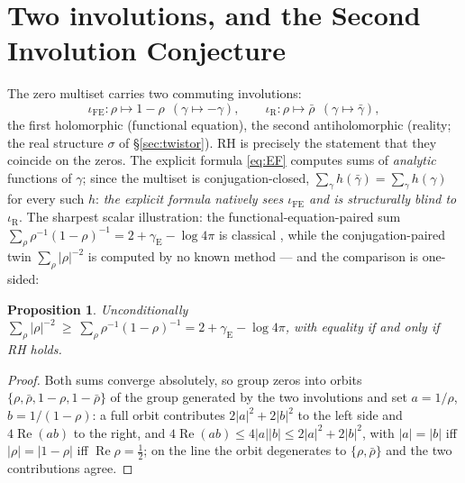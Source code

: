 \documentclass[11pt]{amsart}
\theoremstyle{plain}
\newtheorem{proposition}[theorem]{Proposition}
\theoremstyle{definition}
\theoremstyle{remark}
\newcommand{\re}{\operatorname{Re}}
\begin{document}
\section{Two involutions, and the Second Involution Conjecture}\label{sec:conjecture}

The zero multiset carries two commuting involutions:
\[
\iota_{\mathrm{FE}}:\rho\mapsto1-\rho\ \ (\gamma\mapsto-\gamma),\qquad
\iota_{\mathrm{R}}:\rho\mapsto\bar\rho\ \ (\gamma\mapsto\bar\gamma),
\]
the first holomorphic (functional equation), the second antiholomorphic (reality; the real
structure $\sigma$ of \S\ref{sec:twistor}). RH is precisely the statement that they coincide on
the zeros. The explicit formula \eqref{eq:EF} computes sums of \emph{analytic} functions of
$\gamma$; since the multiset is conjugation-closed, $\sum_\gamma h(\bar\gamma)=\sum_\gamma
h(\gamma)$ for every such $h$: \emph{the explicit formula natively sees $\iota_{\mathrm{FE}}$ and
is structurally blind to $\iota_{\mathrm{R}}$}. The sharpest scalar illustration: the
functional-equation-paired sum $\sum_\rho\rho^{-1}(1-\rho)^{-1}=2+\gamma_{\mathrm{E}}-\log4\pi$ is
classical \cite[Ch.~12]{Davenport2000}, while the conjugation-paired twin
$\sum_\rho|\rho|^{-2}$ is computed by no known method --- and the comparison is one-sided:

\begin{proposition}\label{prop:gateway}
Unconditionally $\sum_\rho|\rho|^{-2}\ \ge\ \sum_\rho\rho^{-1}(1-\rho)^{-1}
=2+\gamma_{\mathrm{E}}-\log4\pi$, with equality if and only if RH holds.
\end{proposition}

\begin{proof}
Both sums converge absolutely, so group zeros into orbits $\{\rho,\bar\rho,1-\rho,1-\bar\rho\}$ of
the group generated by the two involutions and set $a=1/\rho$, $b=1/(1-\rho)$: a full orbit
contributes $2|a|^2+2|b|^2$ to the left side and $4\re(ab)$ to the right, and
$4\re(ab)\le4|a||b|\le2|a|^2+2|b|^2$, with $|a|=|b|$ iff $|\rho|=|1-\rho|$ iff
$\re\rho=\tfrac12$; on the line the orbit degenerates to $\{\rho,\bar\rho\}$ and the two
contributions agree.
\end{proof}
\end{document}
